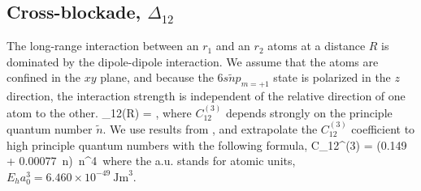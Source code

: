 \subsection{Cross-blockade, $\Delta_{12}$}
The long-range interaction between an $r_1$ and an $r_2$ atoms at a distance $R$
is dominated by the dipole-dipole interaction. We assume that the atoms are
confined in the $xy$ plane, and  because the $6s\tilde n p_{m=+1}$ state is
polarized in the $z$ direction, the interaction strength is independent of the
relative direction of one atom to the other.
\bel
\label{eq:Delta_{12}(a)}
	\Delta_{12}(R) = ,
\eel
where $C_{12}^{(3)}$ depends strongly on the principle quantum number $\tilde
n$. We use results from \cite{Topcu2015}, and extrapolate the $C_{12}^{(3)}$
coefficient to high principle quantum numbers with the following formula,
\bel
	C_{12}^{(3)} = (0.149 + 0.00077\, \tilde n) \,\tilde n^{4}\,
\eel
where the a.u. stands for atomic units, $E_h a_0^3 = 6.460\times
10^{-49}~\mathrm{Jm}^3$.



